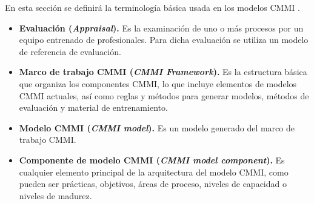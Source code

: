 En esta sección se definirá la terminología básica usada en los modelos CMMI \cite{term}.

 
\begin{itemize}
\item \textbf{Evaluación (\textit{Appraisal}).} Es la examinación de uno o más procesos por un equipo entrenado de profesionales. Para dicha evaluación se utiliza un modelo de referencia de evaluación.
\item \textbf{Marco de trabajo CMMI (\textit{CMMI Framework}).} Es la estructura básica que organiza los componentes CMMI, lo que incluye elementos de modelos CMMI actuales, así como reglas y métodos para generar modelos, métodos de evaluación y material de entrenamiento.
\item \textbf{Modelo CMMI (\textit{CMMI model}).} Es un modelo generado del marco de trabajo CMMI.
\item \textbf{\hypertarget{componente}{Componente de modelo CMMI} (\textit{CMMI model component}).} Es cualquier elemento principal de la arquitectura del modelo CMMI, como pueden ser prácticas, objetivos, áreas de proceso, niveles de capacidad o niveles de madurez.

\end{itemize}
